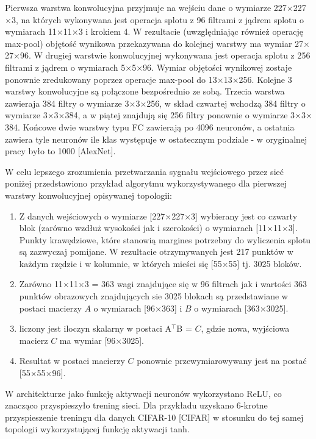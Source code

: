 Pierwsza warstwa konwolucyjna przyjmuje na wejściu dane o wymiarze 227$\times$227$\times$3, na których wykonywana jest operacja splotu z 96 filtrami z jądrem splotu o wymiarach 11$\times$11$\times$3 i krokiem 4. W rezultacie (uwzględniając również operację max-pool) objętość wynikowa przekazywana do kolejnej warstwy ma wymiar 27$\times$27$\times$96. W drugiej warstwie konwolucyjnej wykonywana jest operacja splotu z 256 filtrami z jądrem o wymiarach 5$\times$5$\times$96. Wymiar objętości wynikowej zostaje ponownie zredukowany poprzez operacje max-pool do 13$\times$13$\times$256. Kolejne 3 warstwy konwolucyjne są połączone bezpośrednio ze sobą. Trzecia warstwa zawieraja 384 filtry o wymiarze 3$\times$3$\times$256, w skład czwartej wchodzą 384 filtry o wymiarze 3$\times$3$\times$384, a w piątej znajdują się 256 filtry ponownie o wymiarze 3$\times$3$\times$384. Końcowe dwie warstwy typu FC zawierają po 4096 neuronów, a ostatnia zawiera tyle neuronów ile klas występuje w ostatecznym podziale - w oryginalnej pracy było to 1000 [AlexNet].

W celu lepszego zrozumienia przetwarzania sygnału wejściowego przez sieć poniżej przedstawiono przykład algorytmu wykorzystywanego dla pierwszej warstwy konwolucyjnej opisywanej topologii: 
\begin{enumerate}
\item Z danych wejściowych o wymiarze [227$\times$227$\times$3] wybierany jest co czwarty blok (zarówno wzdłuż wysokości jak i szerokości) o wymiarach [11$\times$11$\times$3]. Punkty krawędziowe, które stanowią margines potrzebny do wyliczenia splotu są zazwyczaj pomijane. W rezultacie otrzymywanych jest 217 punktów w każdym rzędzie i w kolumnie, w których mieści się [55$\times$55] tj. 3025 bloków.
\item Zarówno 11$\times$11$\times$3 = 363 wagi znajdujące się w 96 filtrach jak i wartości 363 punktów obrazowych znajdujących sie 3025 blokach są przedstawiane w postaci macierzy $A$ o wymiarach [96$\times$363] i $B$ o wymiarach [363$\times$3025].
\item liczony jest iloczyn skalarny w postaci A$^\intercal$B = $C$, gdzie nowa, wyjściowa macierz $C$ ma wymiar [96$\times$3025].
\item Resultat w postaci macierzy $C$ ponownie przewymiarowywany jest na postać [55$\times$55$\times$96].  
\end{enumerate} 

W architekturze jako funkcję aktywacji neuronów wykorzystano ReLU, co znacząco przyspieszyło trening sieci. Dla przykładu uzyskano 6-krotne przyspieszenie treningu dla danych CIFAR-10 [CIFAR] w stosunku do tej samej topologii wykorzystującej funkcję aktywacji tanh.


